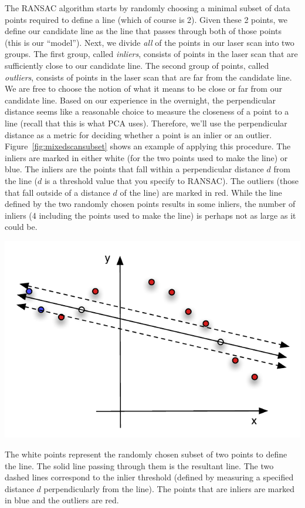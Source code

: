 \documentclass{tufte-handout}
\begin{document}
The RANSAC algorithm starts by randomly choosing a minimal subset of data points required to define a line (which of course is 2).  Given these 2 points, we define our candidate line as the line that passes through both of those points (this is our ``model'').  Next, we divide \emph{all} of the points in our laser scan into two groups.  The first group, called \emph{inliers}, consists of points in the laser scan that are sufficiently close to our candidate line.  The second group of points, called \emph{outliers}, consists of points in the laser scan that are far from the candidate line.  We are free to choose the notion of what it means to be close or far from our candidate line.  Based on our experience in the overnight, the perpendicular distance seems like a reasonable choice to measure the closeness of a point to a line (recall that this is what PCA uses).  Therefore, we'll use the perpendicular distance as a metric for deciding whether a point is an inlier or an outlier.  Figure~\ref{fig:mixedscansubset} shows an example of applying this procedure.  The inliers are marked in either white (for the two points used to make the line) or blue.  The inliers are the points that fall within a perpendicular distance $d$ from the line ($d$ is a threshold value that you specify to RANSAC).  The outliers (those that fall outside of a distance $d$ of the line) are marked in red.  While the line defined by the two randomly chosen points results in some inliers, the number of inliers (4 including the points used to make the line) is perhaps not as large as it could be.

\begin{marginfigure}
\begin{center}
\includegraphics[width=\linewidth]{Figures/mixedscansubset}
\end{center}
\caption{The white points represent the randomly chosen subset of two points to define the line.  The solid line passing through them is the resultant line.  The two dashed lines correspond to the inlier threshold (defined by measuring a specified distance $d$ perpendicularly from the line).  The points that are inliers are marked in blue and the outliers are red.\label{fig:mixedscansubset}}
\end{marginfigure}
\end{document}
